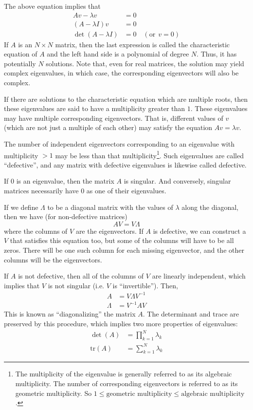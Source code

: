 \documentclass[twoside,letterpaper,11pt]{article}
\begin{document}
The above equation implies that 
\begin{align}
A v - \lambda v &= 0 \\
(A - \lambda I) v &= 0 \\
\det(A-\lambda I) &= 0 \quad (\text{or} ~~ v = 0)
\end{align}
If $A$ is an $N \times N$ matrix, then the last expression is called the characteristic
equation of $A$ and the left hand side is a polynomial of degree $N$.
Thus, it has potentially $N$ solutions.  
Note that, even for real matrices, the solution may yield complex eigenvalues, in which
case, the corresponding eigenvectors will also be complex.

If there are solutions to the characteristic equation which are multiple roots, then these
eigenvalues are said to have a multiplicity greater than $1$.  These eigenvalues 
may have multiple corresponding eigenvectors.  That is, different values of $v$ 
(which are not just a multiple of each other) may satisfy the equation $A v = \lambda v$.

The number of independent eigenvectors
corresponding to an eigenvalue with multiplicity $> 1$ may be less than that multiplicity\footnote{
The multiplicity of the eigenvalue is generally referred to as its algebraic multiplicity.
The number of corresponding eigenvectors is referred to as its geometric multiplicity.
So $1 \leq \text{geometric multiplicity} \leq \text{algebraic multiplicity}$.}.  Such eigenvalues
are called ``defective'', and any matrix with defective eigenvalues is likewise
called defective.

If $0$ is an eigenvalue, then the matrix $A$ is singular.
And conversely, singular matrices necessarily have $0$ as one of their eigenvalues.

If we define $\Lambda$ to be a diagonal matrix with the values of $\lambda$ along
the diagonal, then we have (for non-defective matrices)
\begin{equation}
A V = V \Lambda
\end{equation}
where the columns of $V$ are the eigenvectors.  If $A$ is defective, we can construct
a $V$ that satisfies this equation too, but some of the columns will have to be all zeros.
There will be one such column for each missing eigenvector, and the other columns will
be the eigenvectors.

If $A$ is not defective, then all of the columns of $V$ are linearly independent, which
implies that $V$ is not singular (i.e. $V$ is ``invertible'').  Then,
\begin{align}
A &= V \Lambda V^{-1}\\
\Lambda &= V^{-1} A V
\end{align}
This is known as ``diagonalizing'' the matrix $A$.  The determinant and trace are preserved by this procedure, which implies two more properties of eigenvalues:
\begin{align}
\det(A) &= \prod_{k=1}^{N} \lambda_k\\
\text{tr}(A) &= \sum_{k=1}^{N} \lambda_k
\end{align}
\end{document}
